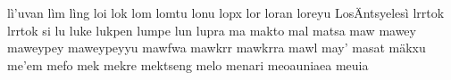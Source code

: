 lì'uvan\hspace{2mm}
lìm\hspace{2mm}
lìng\hspace{2mm}
loi\hspace{2mm}
lok\hspace{2mm}
lom\hspace{2mm}
lomtu\hspace{2mm}
lonu\hspace{2mm}
lopx\hspace{2mm}
lor\hspace{2mm}
loran\hspace{2mm}
loreyu\hspace{2mm}
LosÄntsyelesì\hspace{2mm}
lrrtok\hspace{2mm}
lrrtok si\hspace{2mm}
lu\hspace{2mm}
luke\hspace{2mm}
lukpen\hspace{2mm}
lumpe\hspace{2mm}
lun\hspace{2mm}
lupra\hspace{2mm}
ma\hspace{2mm}
makto\hspace{2mm}
mal\hspace{2mm}
matsa\hspace{2mm}
maw\hspace{2mm}
mawey\hspace{2mm}
maweypey\hspace{2mm}
maweypeyyu\hspace{2mm}
mawfwa\hspace{2mm}
mawkrr\hspace{2mm}
mawkrra\hspace{2mm}
mawl\hspace{2mm}
may'\hspace{2mm}
masat\hspace{2mm}
mäkxu\hspace{2mm}
me'em\hspace{2mm}
mefo\hspace{2mm}
mek\hspace{2mm}
mekre\hspace{2mm}
mektseng\hspace{2mm}
melo\hspace{2mm}
menari\hspace{2mm}
meoauniaea\hspace{2mm}
meuia\hspace{2mm}
